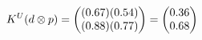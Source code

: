 \documentclass[preview]{standalone}
\begin{document}
\begin{align*}
\special{dvisvgm:raw <g id='unique000'>}K^U(d \otimes p) = \begin{pmatrix} (0.67)(0.54) \\ (0.88)(0.77) \end{pmatrix} = \begin{pmatrix} 0.36 \\ 0.68 \end{pmatrix}\special{dvisvgm:raw </g>}
\end{align*}
\end{document}
